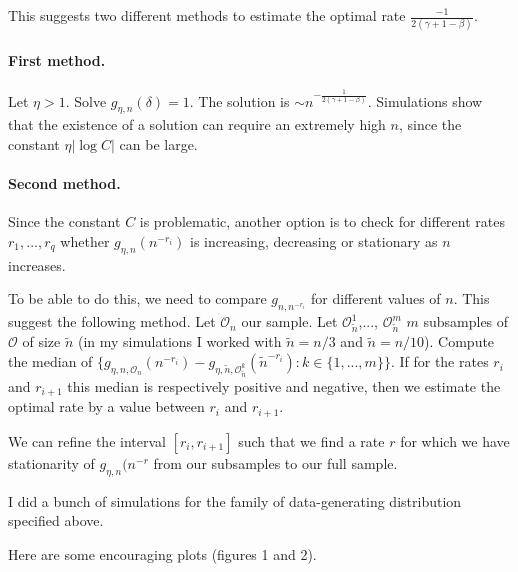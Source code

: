 \documentclass[a4paper]{article}
\begin{document}
This suggests two different methods to estimate the optimal rate $\frac{-1}{2(\gamma + 1 - \beta)}$.

\paragraph{First method.} Let $\eta > 1$. Solve $g_{\eta, n}(\delta) = 1$. The solution is $\sim n^{-\frac{1}{2(\gamma + 1 - \beta)}}$. Simulations show that the existence of a solution can require an extremely high $n$, since the constant $\eta |\log C|$ can be large.

\paragraph{Second method.} Since the constant $C$ is problematic, another option is to check for different rates $r_1, ..., r_q$ whether $g_{\eta, n}(n^{-r_i})$ is increasing, decreasing or stationary as $n$ increases.

To be able to do this, we need to compare $g_{n, n^{-r_i}}$ for different values of $n$. This suggest the following method. Let $\mathcal{O}_n$ our sample. Let $\mathcal{O}_{\tilde{n}}^1$,..., $\mathcal{O}_{\tilde{n}}^m$ $m$ subsamples of $\mathcal{O}$ of size $\tilde{n}$ (in my simulations I worked with $\tilde{n} = n / 3$ and $\tilde{n} = n / 10$). Compute the median of $\{g_{\eta, n, \mathcal{O}_n}(n^{-r_i}) - g_{\eta, \tilde{n}, \mathcal{O}_{\tilde{n}}^k}(\tilde{n}^{-r_i}) : k \in \{1,...,m\} \}$. If for the rates $r_i$ and $r_{i + 1}$ this median is respectively positive and negative, then we estimate the optimal rate by a value between $r_i$ and $r_{i+1}$.

We can refine the interval $[r_i, r_{i+1}]$ such that we find a rate $r$ for which we have stationarity of $g_{\eta, n}(n^{-r}$ from our subsamples to our full sample.


I did a bunch of simulations for the family of data-generating distribution specified above. 

Here are some encouraging plots (figures 1 and 2).
\end{document}
